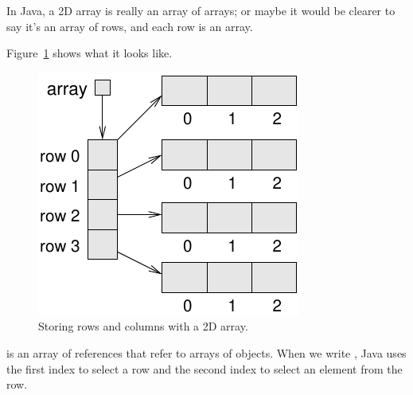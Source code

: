 In Java, a 2D array is really an array of arrays; or maybe it would be clearer to say it's an array of rows, and each row is an array.

%
%
%

Figure~\ref{fig:2D-array} shows what it looks like.

\begin{figure}[!ht]
\begin{center}
\includegraphics{figs/2D-array.pdf}
\caption{Storing rows and columns with a 2D array.}
\label{fig:2D-array}
\end{center}
\end{figure}

 is an array of references that refer to arrays of  objects.
When we write , Java uses the first index to select a row and the second index to select an element from the row.

